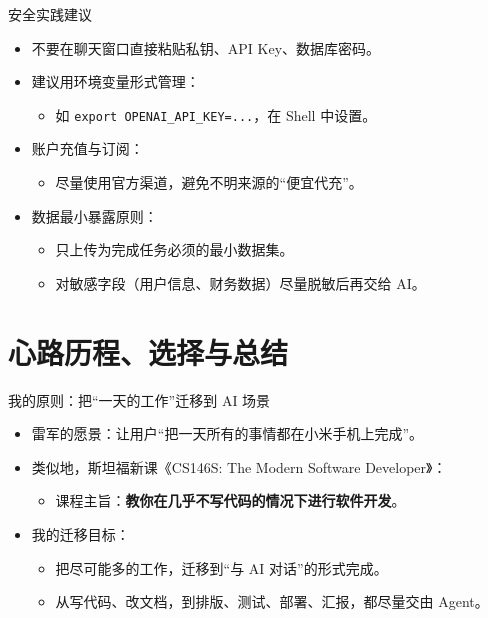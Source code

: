 \documentclass[aspectratio=169]{beamer}
\begin{document}
\begin{frame}{安全实践建议}
  \begin{itemize}
    \item 不要在聊天窗口直接粘贴私钥、API Key、数据库密码。
    \item 建议用环境变量形式管理：
      \begin{itemize}
        \item 如 \verb|export OPENAI_API_KEY=...|，在 Shell 中设置。
      \end{itemize}
    \item 账户充值与订阅：
      \begin{itemize}
        \item 尽量使用官方渠道，避免不明来源的“便宜代充”。
      \end{itemize}
    \item 数据最小暴露原则：
      \begin{itemize}
        \item 只上传为完成任务必须的最小数据集。
        \item 对敏感字段（用户信息、财务数据）尽量脱敏后再交给 AI。
      \end{itemize}
  \end{itemize}
\end{frame}

\section{心路历程、选择与总结}

\begin{frame}{我的原则：把“一天的工作”迁移到 AI 场景}
  \begin{itemize}
    \item 雷军的愿景：让用户“把一天所有的事情都在小米手机上完成”。
    \item 类似地，斯坦福新课《CS146S: The Modern Software Developer》：
      \begin{itemize}
        \item 课程主旨：\textbf{教你在几乎不写代码的情况下进行软件开发}。
      \end{itemize}
    \item 我的迁移目标：
      \begin{itemize}
        \item 把尽可能多的工作，迁移到“与 AI 对话”的形式完成。
        \item 从写代码、改文档，到排版、测试、部署、汇报，都尽量交由 Agent。
      \end{itemize}
  \end{itemize}
\end{frame}
\end{document}
